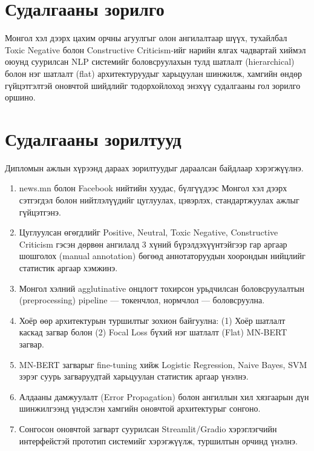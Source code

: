 \section*{Судалгааны зорилго}

Монгол хэл дээрх цахим орчны агуулгыг олон ангилалтаар шүүх, тухайлбал Toxic
Negative болон Constructive Criticism-ийг нарийн ялгах чадвартай хиймэл оюунд
суурилсан NLP системийг боловсруулахын тулд шатлалт (hierarchical) болон нэг
шатлалт (flat) архитектуруудыг харьцуулан шинжилж, хамгийн өндөр гүйцэтгэлтэй
оновчтой шийдлийг тодорхойлоход энэхүү судалгааны гол зорилго оршино.

\section*{Судалгааны зорилтууд}

Дипломын ажлын хүрээнд дараах зорилтуудыг дараалсан байдлаар хэрэгжүүлнэ.

\begin{enumerate}
  \item news.mn болон Facebook нийтийн хуудас, бүлгүүдээс Монгол хэл дээрх
        сэтгэгдэл болон нийтлэлүүдийг цуглуулах, цэвэрлэх, стандартжуулах
        ажлыг гүйцэтгэнэ.

  \item Цуглуулсан өгөгдлийг Positive, Neutral, Toxic Negative, Constructive
        Criticism гэсэн дөрвөн ангилалд 3 хүний бүрэлдэхүүнтэйгээр гар аргаар
        шошголох (manual annotation) бөгөөд аннотаторуудын хоорондын нийцлийг
        статистик аргаар хэмжинэ.

  \item Монгол хэлний agglutinative онцлогт тохирсон урьдчилсан боловсруулалтын
        (preprocessing) pipeline --- токенчлол, нормчлол --- боловсруулна.

  \item Хоёр өөр архитектурын туршилтыг зохион байгуулна: (1) Хоёр шатлалт
        каскад загвар болон (2) Focal Loss бүхий нэг шатлалт (Flat) MN-BERT
        загвар.

  \item MN-BERT загварыг fine-tuning хийж Logistic Regression, Naive Bayes,
        SVM зэрэг суурь загваруудтай харьцуулан статистик аргаар үнэлнэ.

  \item Алдааны дамжуулалт (Error Propagation) болон ангиллын хил хязгаарын
        дүн шинжилгээнд үндэслэн хамгийн оновчтой архитектурыг сонгоно.

  \item Сонгосон оновчтой загварт суурилсан Streamlit/Gradio хэрэглэгчийн
        интерфейстэй прототип системийг хэрэгжүүлж, туршилтын орчинд үнэлнэ.
\end{enumerate}

